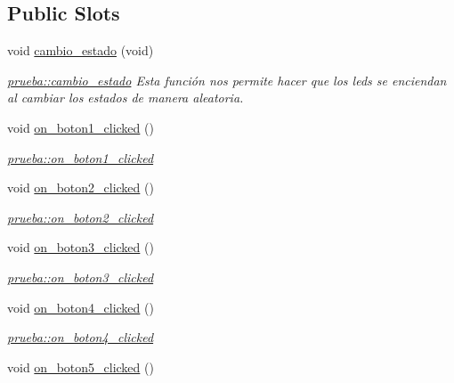 \subsection*{Public Slots}
\begin{DoxyCompactItemize}
\item 
\mbox{\label{classprueba_a149805ab01c4101c9f183029a3621a10}} 
void \hyperlink{classprueba_a149805ab01c4101c9f183029a3621a10}{cambio\+\_\+estado} (void)
\begin{DoxyCompactList}\small\item\em \hyperlink{classprueba_a149805ab01c4101c9f183029a3621a10}{prueba\+::cambio\+\_\+estado} Esta función nos permite hacer que los leds se enciendan al cambiar los estados de manera aleatoria. \end{DoxyCompactList}\item 
void \hyperlink{classprueba_a09d5326f33ef9cfafd86237e733c1093}{on\+\_\+boton1\+\_\+clicked} ()
\begin{DoxyCompactList}\small\item\em \hyperlink{classprueba_a09d5326f33ef9cfafd86237e733c1093}{prueba\+::on\+\_\+boton1\+\_\+clicked} \end{DoxyCompactList}\item 
void \hyperlink{classprueba_ae81b6c5c5782c2348f88bdb0f34b163f}{on\+\_\+boton2\+\_\+clicked} ()
\begin{DoxyCompactList}\small\item\em \hyperlink{classprueba_ae81b6c5c5782c2348f88bdb0f34b163f}{prueba\+::on\+\_\+boton2\+\_\+clicked} \end{DoxyCompactList}\item 
void \hyperlink{classprueba_a622258b2f43536c572613dc4bc3e4e65}{on\+\_\+boton3\+\_\+clicked} ()
\begin{DoxyCompactList}\small\item\em \hyperlink{classprueba_a622258b2f43536c572613dc4bc3e4e65}{prueba\+::on\+\_\+boton3\+\_\+clicked} \end{DoxyCompactList}\item 
void \hyperlink{classprueba_a3de0793fdcb9d6c63382a665ba435736}{on\+\_\+boton4\+\_\+clicked} ()
\begin{DoxyCompactList}\small\item\em \hyperlink{classprueba_a3de0793fdcb9d6c63382a665ba435736}{prueba\+::on\+\_\+boton4\+\_\+clicked} \end{DoxyCompactList}\item 
void \hyperlink{classprueba_a5fe7941d4155bd83e2746e6d29aa9bdb}{on\+\_\+boton5\+\_\+clicked} ()

\end{DoxyCompactItemize}
